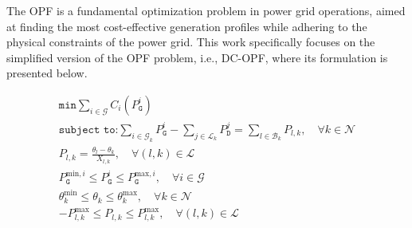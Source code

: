 




 The OPF is a fundamental optimization problem in power grid operations, aimed at finding the most cost-effective generation profiles while adhering to the physical constraints of the power grid. This work specifically focuses on the simplified version of the OPF problem, i.e., DC-OPF, where its formulation is presented below.


\small
\begin{subequations}
\begin{gather}
    \texttt{min} \sum_{i \in \mathcal{G}} C_i(P_{\texttt{G}}^{i}) \label{min} \\
    \texttt{subject to:} 
    \sum_{i \in \mathcal{G}_{k}} P_{\texttt{G}}^{i} - \sum_{j \in \mathcal{L}_{k}} P_{\texttt{D}}^{j} = \sum_{l \in \mathcal{B}_{k}} P_{l,k}, \quad \forall k \in \mathcal{N} \label{PB} \\
    P_{l,k} = \frac{\theta_{l} - \theta_{k}}{X_{l,k}}, \quad \forall (l, k) \in \mathcal{L} \label{LF} \\
    P_{\texttt{G}}^{\text{min},i} \leq P_{\texttt{G}}^{i} \leq P_{\texttt{G}}^{\text{max},i}, \quad \forall i \in \mathcal{G} \label{GL} \\
    \theta_{k}^{\text{min}} \leq \theta_{k} \leq \theta_{k}^{\text{max}}, \quad \forall k \in \mathcal{N} \label{PA} \\
    -P_{l,k}^{\text{max}} \leq P_{l,k} \leq P_{l,k}^{\text{max}}, \quad \forall (l, k) \in \mathcal{L} \label{LC}
\end{gather}
\end{subequations}
\normalsize


